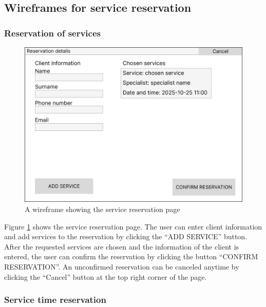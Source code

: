 \documentclass[11pt,a4paper,pdftex]{article}
\begin{document}
\subsection{Wireframes for service reservation}

\subsubsection{Reservation of services}

\begin{figure}[H]
    \centering
    \includegraphics[width=1\linewidth]{wireframes/ServiceReservationInfo.png}
    \caption{A wireframe showing the service reservation page}
    \label{fig:wireframe_service_reservation}
\end{figure}

Figure \ref{fig:wireframe_service_reservation} shows the service reservation page. The user can enter client information and add services to the reservation by clicking the \enquote{ADD SERVICE} button. After the requested services are chosen and the information of the client is entered, the user can confirm the reservation by clicking the button \enquote{CONFIRM RESERVATION}. An unconfirmed reservation can be canceled anytime by clicking the \enquote{Cancel} button at the top right corner of the page.

\subsubsection{Service time reservation}
\end{document}
